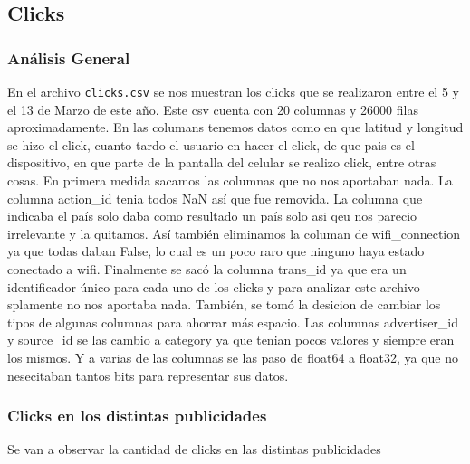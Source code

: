 \documentclass[a4paper, 12pt]{article}
\newcommand\tab[1][1cm]{\hspace*{#1}}
\begin{document}
\clearpage
\subsection{Clicks}
	\subsubsection{Análisis General}
		\tab En el archivo \texttt{clicks.csv} se nos muestran los clicks que se realizaron entre el 5 y el 13 de Marzo de este año. Este csv cuenta con 20 columnas y 26000 filas aproximadamente. En las columans tenemos datos como en que latitud y longitud se hizo el click, cuanto tardo el usuario en hacer el click, de que pais es el dispositivo, en que parte de la pantalla del celular se realizo click, entre otras cosas.
		\tab En primera medida sacamos las columnas que no nos aportaban nada. La columna action\_id tenia todos NaN así que fue removida. La columna que indicaba el país solo daba como resultado un país solo asi qeu nos parecio irrelevante y la quitamos. Así también eliminamos la columan de wifi\_connection ya que todas daban False, lo cual es un poco raro que ninguno haya estado conectado a wifi. Finalmente se sacó la columna trans\_id ya que era un identificador único para cada uno de los clicks y para analizar este archivo splamente no nos aportaba nada.
		\tab También, se tomó la desicion de cambiar los tipos de algunas columnas para ahorrar más espacio. Las columnas advertiser\_id y source\_id se las cambio a category ya que tenian pocos valores y siempre eran los mismos. Y a varias de las columnas se las paso de float64 a float32, ya que no nesecitaban tantos bits para representar sus datos.

	\subsubsection{Clicks en los distintas publicidades}
		\tab Se van a observar la cantidad de clicks en las distintas publicidades
\end{document}
